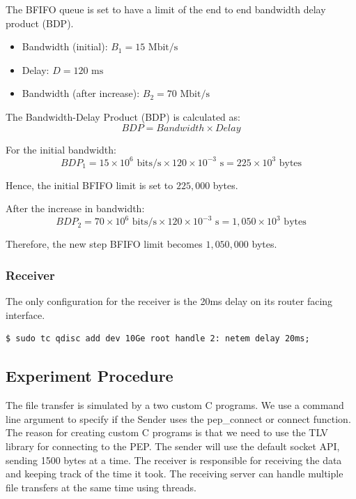 \documentclass[a4paper,english, 11pt]{report}
\begin{document}
The BFIFO queue is set to have a limit of the end to end bandwidth delay product (BDP).\\
\begin{itemize}
    \item Bandwidth (initial): \( B_1 = 15 \text{ Mbit/s} \)
    \item Delay: \( D = 120 \text{ ms} \)
    \item Bandwidth (after increase): \( B_2 = 70 \text{ Mbit/s} \)
\end{itemize}

The Bandwidth-Delay Product (BDP) is calculated as:
\begin{equation}
    BDP = Bandwidth \times Delay
\end{equation}

For the initial bandwidth:
\begin{equation}
    BDP_1 = 15 \times 10^6 \text{ bits/s} \times 120 \times 10^{-3} \text{ s} = 225 \times 10^3 \text{ bytes}
\end{equation}

Hence, the initial BFIFO limit is set to \( 225,000 \) bytes.

After the increase in bandwidth:
\begin{equation}
    BDP_2 = 70 \times 10^6 \text{ bits/s} \times 120 \times 10^{-3} \text{ s} = 1,050 \times 10^3 \text{ bytes}
\end{equation}

Therefore, the new step BFIFO limit becomes \( 1,050,000 \) bytes.

\subsubsection{Receiver}
The only configuration for the receiver is the 20ms delay on its router facing interface.
\begin{verbatim}
$ sudo tc qdisc add dev 10Ge root handle 2: netem delay 20ms;
\end{verbatim}


\subsection{Experiment Procedure}
The file transfer is simulated by a two custom C programs. We use a command line argument to specify if the Sender uses the pep\_connect or connect function. The reason for creating custom C programs is that we need to use the TLV library for connecting to the PEP. The sender will use the default socket API, sending 1500 bytes at a time. The receiver is responsible for receiving the data and keeping track of the time it took. The receiving server can handle multiple file transfers at the same time using threads.\\
\end{document}

